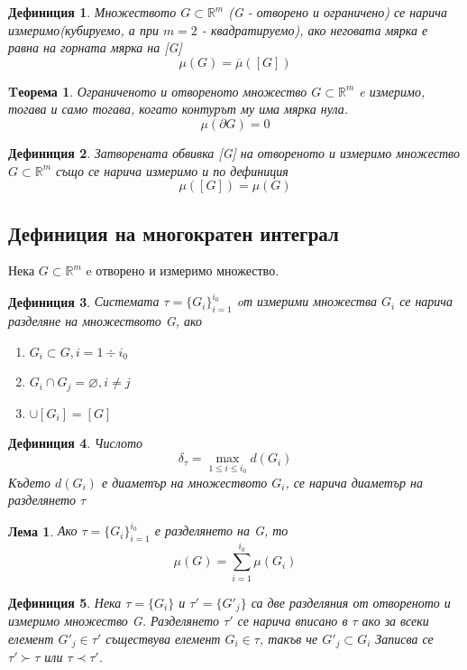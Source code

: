 \documentclass[a4paper,fleqn,12pt]{article}
\newtheorem{theorem}{Tеорема}[subsection]
\newtheorem{lemma}{Лема}[subsection]
\newtheorem{definition}{Дефиниция}[subsection]
\theoremstyle{definition}
\begin{document}
\begin{definition}
Множеството $G \subset \mathbb{R}^m$ (G - отворено и ограничено) се нарича измеримо(кубируемо, а при $m = 2$ - квадратируемо), ако неговата мярка е равна на горната мярка на [G]
$$\mu(G) = \overline{\mu}([G])$$
\end{definition}

\begin{theorem}
Ограниченото и отвореното множество $G \subset \mathbb{R}^m$ e измеримо, тогава и само тогава, когато контурът му има мярка нула.
$$\mu(\partial G) = 0$$
\end{theorem}

\begin{definition}
Затворената обвивка [G] на отвореното и измеримо множество $G \subset \mathbb{R}^m$ също се нарича измеримо и по дефиниция 
$$\mu([G]) = \mu(G)$$
\end{definition}

\subsection{Дефиниция на многократен интеграл}
Нека $G \subset \mathbb{R}^m$ e отворено и измеримо множество.

\begin{definition}
Системата $\tau = \{ G_i\}_{i=1}^{i_0}$ oт измерими множества $G_i$ се нарича разделяне на множеството G, ако

\begin{enumerate}
\item $G_i \subset G, i = 1 \div i_0$
\item $G_i \cap G_j = \varnothing, i \neq j$
\item $\cup[G_i] = [G]$
\end{enumerate}

\end{definition}

\begin{definition}
Числото $$\delta_{\tau} = \max_{1 \leq i \leq i_0} d(G_i)$$
Където $d(G_i)$ е диаметър на множеството $G_i$, се нарича диаметър на разделянето $\tau$
\end{definition}

\begin{lemma}
Ако $\tau = \{ G_i\}_{i=1}^{i_0}$ е разделянето на G, то
$$\mu(G) = \sum_{i=1}^{i_0} \mu(G_i)$$
\end{lemma}

\begin{definition}
Нека $\tau = \{ G_i\}$ и $\tau' = \{ G'_j\}$ са две разделяния от отвореното и измеримо множество G. Разделянето $\tau'$ се нарича вписано в $\tau$ ако за всеки елемент $G'_j \in \tau'$ съществува елемент $G_i \in \tau$, такъв че $G'_j \subset G_i$ Записва се $\tau' \succ \tau$ или $\tau \prec \tau'$.
\end{definition}
\end{document}
